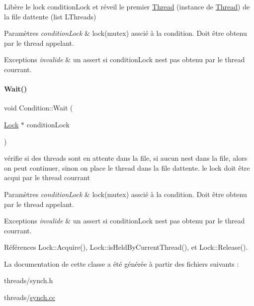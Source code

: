 Libère le lock condition\+Lock et réveil le premier \hyperlink{class_thread}{Thread} (instance de \hyperlink{class_thread}{Thread}) de la file d\textquotesingle{}attente (list L\+Threads) 


\begin{DoxyParams}{Paramètres}
{\em condition\+Lock} & lock(mutex) asscié à la condition. Doit être obtenu par le thread appelant. \\
\hline
\end{DoxyParams}

\begin{DoxyExceptions}{Exceptions}
{\em invalide} & un assert si condition\+Lock n\textquotesingle{}est pas obtenu par le thread courrant. \\
\hline
\end{DoxyExceptions}
\hypertarget{class_condition_aa0442520888bd371ce07d07c0a4313a7}{}\label{class_condition_aa0442520888bd371ce07d07c0a4313a7} 
\paragraph{\texorpdfstring{Wait()}{Wait()}}
{\footnotesize\ttfamily void Condition\+::\+Wait (\begin{DoxyParamCaption}\item[{\hyperlink{class_lock}{Lock} $\ast$}]{condition\+Lock }\end{DoxyParamCaption})}



vérifie si des threads sont en attente dans la file, si aucun n\textquotesingle{}est dans la file, alors on peut continuer, sinon on place le thread dans la file d\textquotesingle{}attente. le lock doit être acqui par le thread courrant 


\begin{DoxyParams}{Paramètres}
{\em condition\+Lock} & lock(mutex) asscié à la condition. Doit être obtenu par le thread appelant. \\
\hline
\end{DoxyParams}

\begin{DoxyExceptions}{Exceptions}
{\em invalide} & un assert si condition\+Lock n\textquotesingle{}est pas obtenu par le thread courrant. \\
\hline
\end{DoxyExceptions}


Références Lock\+::\+Acquire(), Lock\+::is\+Held\+By\+Current\+Thread(), et Lock\+::\+Release().



La documentation de cette classe a été générée à partir des fichiers suivants \+:\begin{DoxyCompactItemize}
\item 
threads/synch.\+h\item 
threads/\hyperlink{synch_8cc}{synch.\+cc}\end{DoxyCompactItemize}
